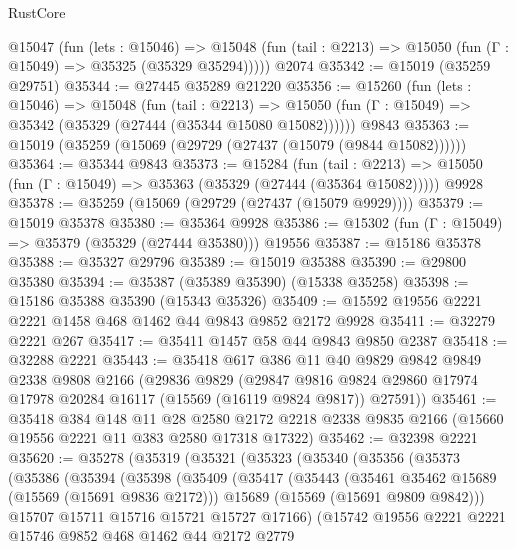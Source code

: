 \begin{lexlean}{RustCore}
\begin{coremodule}
    @15047
      (fun (lets : @15046) =>
      @15048 (fun (tail : @2213) => @15050 (fun (Γ : @15049) => @35325 (@35329 @35294)))))
    @2074
@35342 := @15019 (@35259 @29751)
@35344 := @27445 @35289 @21220
@35356 := @15260
    (fun (lets : @15046) =>
    @15048
      (fun (tail : @2213) =>
      @15050 (fun (Γ : @15049) => @35342 (@35329 (@27444 (@35344 @15080 @15082))))))
    @9843
@35363 := @15019 (@35259 (@15069 (@29729 (@27437 (@15079 (@9844 @15082))))))
@35364 := @35344 @9843
@35373 := @15284
    (fun (tail : @2213) => @15050 (fun (Γ : @15049) => @35363 (@35329 (@27444 (@35364 @15082)))))
    @9928
@35378 := @35259 (@15069 (@29729 (@27437 (@15079 @9929))))
@35379 := @15019 @35378
@35380 := @35364 @9928
@35386 := @15302 (fun (Γ : @15049) => @35379 (@35329 (@27444 @35380))) @19556
@35387 := @15186 @35378
@35388 := @35327 @29796
@35389 := @15019 @35388
@35390 := @29800 @35380
@35394 := @35387 (@35389 @35390) (@15338 @35258)
@35398 := @15186 @35388 @35390 (@15343 @35326)
@35409 := @15592 @19556 @2221 @2221 @1458 @468 @1462 @44 @9843 @9852 @2172 @9928
@35411 := @32279 @2221 @267
@35417 := @35411 @1457 @58 @44 @9843 @9850 @2387
@35418 := @32288 @2221
@35443 := @35418
    @617
    @386
    @11
    @40
    @9829
    @9842
    @9849
    @2338
    @9808
    @2166
    (@29836
      @9829
      (@29847 @9816 @9824 @29860 @17974 @17978 @20284 @16117 (@15569 (@16119 @9824 @9817)) @27591))
@35461 := @35418
    @384
    @148
    @11
    @28
    @2580
    @2172
    @2218
    @2338
    @9835
    @2166
    (@15660 @19556 @2221 @11 @383 @2580 @17318 @17322)
@35462 := @32398 @2221
@35620 := @35278
    (@35319
      (@35321
        (@35323
          (@35340
            (@35356
              (@35373
                (@35386
                  (@35394
                    (@35398
                      (@35409
                        (@35417
                          (@35443
                            (@35461 @35462 @15689 (@15569 (@15691 @9836 @2172)))
                            @15689
                            (@15569 (@15691 @9809 @9842)))
                          @15707
                          @15711
                          @15716
                          @15721
                          @15727
                          @17166)
                        (@15742
                          @19556
                          @2221
                          @2221
                          @15746
                          @9852
                          @468
                          @1462
                          @44
                          @2172
                          @2779

\end{coremodule}
\end{lexlean}
